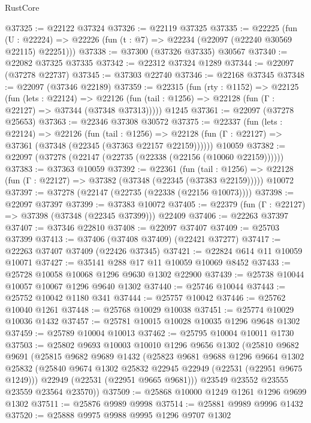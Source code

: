 \begin{lexlean}{RustCore}
\begin{coremodule}
@37325 := @22122 @37324
@37326 := @22119 @37325
@37335 := @22225
    (fun (U : @22224) => @22226 (fun (t : @7) => @22234 (@22097 (@22240 @30569 @22115) @22251)))
@37338 := @37300 (@37326 @37335) @30567
@37340 := @22082 @37325 @37335
@37342 := @22312 @37324 @1289
@37344 := @22097 (@37278 @22737)
@37345 := @37303 @22740
@37346 := @22168 @37345
@37348 := @22097 (@37346 @22189)
@37359 := @22315
    (fun (rty : @1152) =>
    @22125
      (fun (lets : @22124) =>
      @22126 (fun (tail : @1256) => @22128 (fun (Γ : @22127) => @37344 (@37348 @37313)))))
    @1245
@37361 := @22097 (@37278 @25653)
@37363 := @22346 @37308 @30572
@37375 := @22337
    (fun (lets : @22124) =>
    @22126
      (fun (tail : @1256) =>
      @22128 (fun (Γ : @22127) => @37361 (@37348 (@22345 (@37363 @22157 @22159))))))
    @10059
@37382 := @22097 (@37278 (@22147 (@22735 (@22338 (@22156 (@10060 @22159))))))
@37383 := @37363 @10059
@37392 := @22361
    (fun (tail : @1256) => @22128 (fun (Γ : @22127) => @37382 (@37348 (@22345 (@37383 @22159)))))
    @10072
@37397 := @37278 (@22147 (@22735 (@22338 (@22156 @10073))))
@37398 := @22097 @37397
@37399 := @37383 @10072
@37405 := @22379 (fun (Γ : @22127) => @37398 (@37348 (@22345 @37399))) @22409
@37406 := @22263 @37397
@37407 := @37346 @22810
@37408 := @22097 @37407
@37409 := @25703 @37399
@37413 := @37406 (@37408 @37409) (@22421 @37277)
@37417 := @22263 @37407 @37409 (@22426 @37345)
@37421 := @22824 @614 @11 @10059 @10071
@37427 := @35141 @288 @17 @11 @10059 @10069 @8452
@37433 := @25728 @10058 @10068 @1296 @9630 @1302 @22900
@37439 := @25738 @10044 @10057 @10067 @1296 @9640 @1302
@37440 := @25746 @10044
@37443 := @25752 @10042 @1180 @341
@37444 := @25757 @10042
@37446 := @25762 @10040 @1261
@37448 := @25768 @10029 @10038
@37451 := @25774 @10029 @10036 @1432
@37457 := @25781 @10015 @10028 @10035 @1296 @9648 @1302
@37459 := @25789 @10004 @10013
@37462 := @25795 @10004 @10011 @1730
@37503 := @25802
    @9693
    @10003
    @10010
    @1296
    @9656
    @1302
    (@25810
      @9682
      @9691
      (@25815
        @9682
        @9689
        @1432
        (@25823
          @9681
          @9688
          @1296
          @9664
          @1302
          @25832
          (@25840 @9674 @1302 @25832 @22945 @22949 (@22531 (@22951 @9675 @1249)))
          @22949
          (@22531 (@22951 @9665 @9681)))
        @23549
        @23552
        @23555
        @23559
        @23564
        @23570))
@37509 := @25868 @10000 @1249 @1261 @1296 @9699 @1302
@37511 := @25876 @9989 @9998
@37514 := @25881 @9989 @9996 @1432
@37520 := @25888 @9975 @9988 @9995 @1296 @9707 @1302

\end{coremodule}
\end{lexlean}
